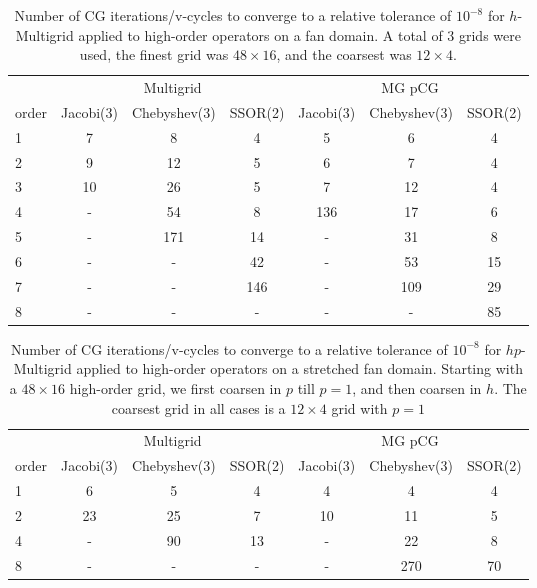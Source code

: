 \begin{table}
  \caption{\label{tab:homg} Number of CG iterations/v-cycles to converge to a relative tolerance of $10^{-8}$ for $h$-Multigrid applied to high-order operators on a fan domain. A total of 3 grids were used, the finest grid was $48\times 16$, and the coarsest was $12\times 4$.}
		\centering
    \begin{tabular}{|l|c|c|c|c|c|c|} 
	    \hline
				    & \multicolumn{3}{c|}{Multigrid} & \multicolumn{3}{c|}{MG pCG}\\  \cline{2-7}
			order & \scriptsize Jacobi(3)  &\scriptsize  Chebyshev(3)  &\scriptsize SSOR(2) &\scriptsize Jacobi(3)  &\scriptsize  Chebyshev(3)  &\scriptsize SSOR(2) \\
			\hline
      1 & 7  & 8  & 4 & 5 & 6 & 4 \\ 
	    2 & 9  & 12 & 5 & 6 & 7 & 4 \\	
			3 & 10 & 26 & 5 & 7 & 12 & 4 \\
      4 & -  & 54 & 8 & 136 & 17 & 6 \\
      5 & - & 171 & 14 & - & 31 & 8 \\
      6 & - & - & 42 & - & 53 & 15 \\
      7 & - & - & 146 & - & 109 & 29 \\
      8 & - & - & -  & - & -  & 85 \\
      \hline
	  \end{tabular}
\end{table}


\begin{table}
  \caption{\label{tab:hpmg} Number of CG iterations/v-cycles to converge to a relative tolerance of $10^{-8}$ for $hp$-Multigrid applied to high-order operators on a stretched fan domain. Starting with a $48\times 16$ high-order grid, we first coarsen in $p$ till $p=1$, and then coarsen in $h$. The coarsest grid in all cases is a $12\times 4$ grid with $p=1$}
		\centering
		\begin{tabular}{|l|c|c|c|c|c|c|} 
	    \hline
				    & \multicolumn{3}{c|}{Multigrid} & \multicolumn{3}{c|}{MG pCG}\\  \cline{2-7}
			order & \scriptsize Jacobi(3)  &\scriptsize  Chebyshev(3)  &\scriptsize SSOR(2) &\scriptsize Jacobi(3)  &\scriptsize  Chebyshev(3)  &\scriptsize SSOR(2) \\
			\hline
				1 & 6  &  5 &  4 & 4 & 4 & 4 \\ 
        2 & 23 & 25 & 7 & 10 & 11 & 5 \\
				4 & - & 90 & 13 & - & 22 & 8 \\
        8 & - & - & - & - & 270 & 70 \\
			\hline
	  \end{tabular}
\end{table}

